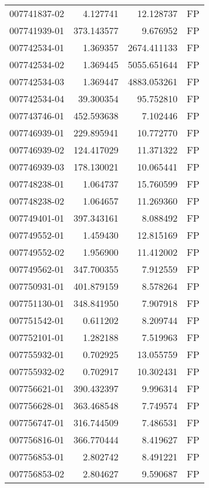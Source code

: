 \begin{tabular}{lrrl}
007741837-02 &    4.127741 &      12.128737 &   FP \\
007741939-01 &  373.143577 &       9.676952 &   FP \\
007742534-01 &    1.369357 &    2674.411133 &   FP \\
007742534-02 &    1.369445 &    5055.651644 &   FP \\
007742534-03 &    1.369447 &    4883.053261 &   FP \\
007742534-04 &   39.300354 &      95.752810 &   FP \\
007743746-01 &  452.593638 &       7.102446 &   FP \\
007746939-01 &  229.895941 &      10.772770 &   FP \\
007746939-02 &  124.417029 &      11.371322 &   FP \\
007746939-03 &  178.130021 &      10.065441 &   FP \\
007748238-01 &    1.064737 &      15.760599 &   FP \\
007748238-02 &    1.064657 &      11.269360 &   FP \\
007749401-01 &  397.343161 &       8.088492 &   FP \\
007749552-01 &    1.459430 &      12.815169 &   FP \\
007749552-02 &    1.956900 &      11.412002 &   FP \\
007749562-01 &  347.700355 &       7.912559 &   FP \\
007750931-01 &  401.879159 &       8.578264 &   FP \\
007751130-01 &  348.841950 &       7.907918 &   FP \\
007751542-01 &    0.611202 &       8.209744 &   FP \\
007752101-01 &    1.282188 &       7.519963 &   FP \\
007755932-01 &    0.702925 &      13.055759 &   FP \\
007755932-02 &    0.702917 &      10.302431 &   FP \\
007756621-01 &  390.432397 &       9.996314 &   FP \\
007756628-01 &  363.468548 &       7.749574 &   FP \\
007756747-01 &  316.744509 &       7.486531 &   FP \\
007756816-01 &  366.770444 &       8.419627 &   FP \\
007756853-01 &    2.802742 &       8.491221 &   FP \\
007756853-02 &    2.804627 &       9.590687 &   FP \\

\end{tabular}
